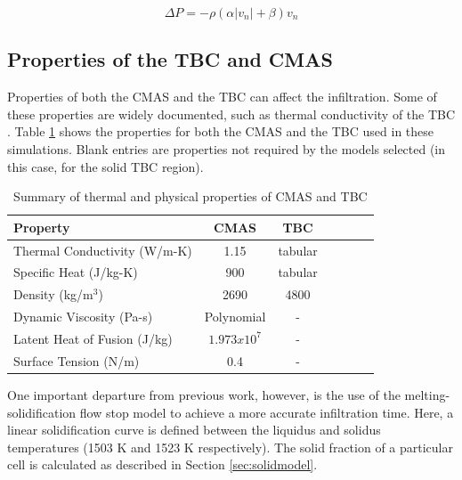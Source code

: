 \documentclass{UCF_ETD}
\begin{document}
\begin{equation}
\label{porous:equation}
    \Delta P = -\rho (\alpha |v_n| + \beta)v_n
\end{equation}

\subsection{Properties of the TBC and CMAS}
\label{subsec:CMAS/TBCProp}
Properties of both the CMAS and the TBC can affect the infiltration. Some of these properties are widely documented, such as thermal conductivity of the TBC \cite{Han2023}. Table \ref{tab:CMAS and TBC properties} shows the properties for both the CMAS and the TBC used in these simulations. Blank entries are properties not required by the models selected (in this case, for the solid TBC region).


\begin{table}[htp!]
\caption{\label{tab:CMAS and TBC properties} Summary of thermal and physical properties of CMAS and TBC}
\centering
\begin{tabular}{lcccccc}
Property & CMAS& TBC\\\hline
Thermal Conductivity (W/m-K)& 1.15 \cite{Bakal2017} & tabular \cite{Han2023} \\
Specific Heat (J/kg-K)& 900 \cite{KAKUDA2015350} & tabular \cite{Han2023} \\
Density (kg/m$^3$)& 2690 \cite{BANSAL20153901}& 4800 \cite{KAKUDA20092583}\\
Dynamic Viscosity (Pa-s)& Polynomial \cite{Naraparaju2019}& -\\
Latent Heat of Fusion (J/kg)& $1.973x10^7$ \cite{Costa2019}& -\\
Surface Tension (N/m)& 0.4 \cite{Bravo2020}& -\\
\end{tabular}
\end{table}

One important departure from previous work, however, is the use of the melting-solidification flow stop model to achieve a more accurate infiltration time. Here, a linear solidification curve is defined between the liquidus and solidus temperatures (1503 K and 1523 K respectively). The solid fraction of a particular cell is calculated as described in Section \ref{sec:solidmodel}.
\end{document}
